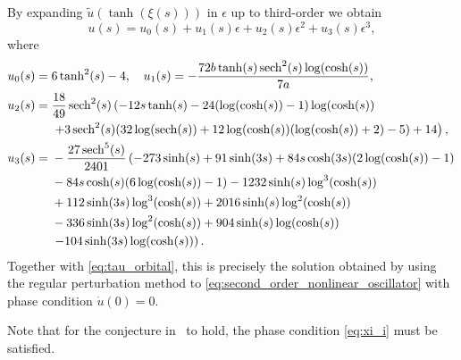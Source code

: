 \begin{remark}
By expanding $\tilde {u}\left(\tanh\left(\xi(s)\right)\right)$ in $\epsilon$ up
to third-order we obtain
\[
    u(s) = u_0(s) + u_1(s) \epsilon + u_2(s) \epsilon^2 + u_3(s) \epsilon^3,
\]
where
\begin{equation}
\label{eq:u_orbital}    
\begin{aligned}
    u_0(s) ={}& 6 \tanh^2(s) - 4, \quad
    u_1(s) = -\frac{72 b \tanh(s) \operatorname{sech}^2(s) \log(\cosh(s))}{7 a}, \\
    u_2(s) ={}& \frac{18}{49} \operatorname{sech}^2(s) \left(-12 s \tanh (s)-24 (\log(\cosh(s))-1) \log(\cosh(s)) \right. \\
              &  \left. +3 \operatorname{sech}^2(s) (32 \log(\operatorname{sech}(s))+12 \log(\cosh(s)) (\log(\cosh(s))+2)-5)+14\right), \\
    u_3(s) ={}& -\frac{27 \operatorname{sech}^5(s)}{2401}  \left(-273 \sinh(s)+91 \sinh(3 s)+84 s \cosh(3 s) (2 \log(\cosh(s))-1) \right. \\
              & -84 s \cosh(s) (6 \log(\cosh(s))-1)-1232 \sinh(s) \log^3(\cosh(s)) \\
              & +112 \sinh(3 s) \log^3(\cosh(s))+2016 \sinh(s) \log^2(\cosh(s)) \\
              & -336 \sinh(3s) \log^2(\cosh(s))+904 \sinh(s) \log(\cosh(s)) \\
              & \left. -104 \sinh(3 s) \log(\cosh(s))\right).
\end{aligned}
\end{equation}
Together with \cref{eq:tau_orbital}, this is precisely the solution obtained
by using the regular perturbation method to
\cref{eq:second_order_nonlinear_oscillator} with phase condition $\dot u(0)=0$.

Note that for the conjecture in~\cite[Section 7]{Al-Hdaibat2016} to
hold, the phase condition \cref{eq:xi_i} must be satisfied.
\end{remark}

